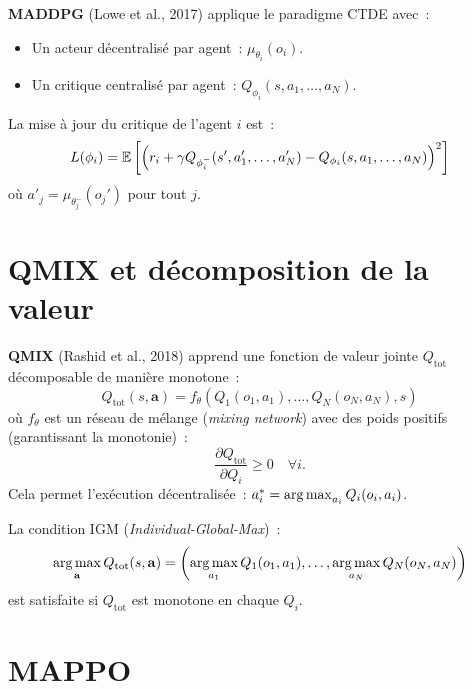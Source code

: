 \begin{definition}[MADDPG]
\textbf{MADDPG} (Lowe et al., 2017) applique le paradigme CTDE avec~:
\begin{itemize}
    \item Un acteur d\'ecentralis\'e par agent~: $\mu_{\theta_i}(o_i)$.
    \item Un critique centralis\'e par agent~: $Q_{\phi_i}(s, a_1, \ldots, a_N)$.
\end{itemize}
La mise \`a jour du critique de l'agent $i$ est~:
\[
    L(\phi_i) = \mathbb{E}\left[\left(r_i + \gamma Q_{\phi_i^-}(s', a'_1, \ldots, a'_N)
    - Q_{\phi_i}(s, a_1, \ldots, a_N)\right)^2\right]
\]
o\`u $a'_j = \mu_{\theta_j^-}(o_j')$ pour tout $j$.
\end{definition}

\section{QMIX et d\'ecomposition de la valeur}

\begin{definition}[QMIX]
\textbf{QMIX} (Rashid et al., 2018) apprend une fonction de valeur jointe
$Q_{\text{tot}}$ d\'ecomposable de mani\`ere monotone~:
\[
    Q_{\text{tot}}(s, \mathbf{a}) = f_\theta(Q_1(o_1, a_1), \ldots, Q_N(o_N, a_N), s)
\]
o\`u $f_\theta$ est un r\'eseau de m\'elange (\emph{mixing network}) avec des poids
positifs (garantissant la monotonie)~:
\[
    \frac{\partial Q_{\text{tot}}}{\partial Q_i} \geq 0 \quad \forall i.
\]
Cela permet l'ex\'ecution d\'ecentralis\'ee~: $a_i^* = \operatorname*{arg\,max}_{a_i} Q_i(o_i, a_i)$.
\end{definition}

\begin{theoreme}
La condition IGM (\emph{Individual-Global-Max})~:
\[
    \operatorname*{arg\,max}_{\mathbf{a}} Q_{\text{tot}}(s, \mathbf{a}) =
    \left(\operatorname*{arg\,max}_{a_1} Q_1(o_1, a_1), \ldots, \operatorname*{arg\,max}_{a_N} Q_N(o_N, a_N)\right)
\]
est satisfaite si $Q_{\text{tot}}$ est monotone en chaque $Q_i$.
\end{theoreme}

\section{MAPPO}

